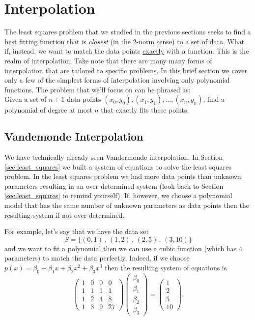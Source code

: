 \newpage
\section{Interpolation}
The least squares problem that we studied in the previous sections seeks to find a best
fitting function that is {\it closest} (in the 2-norm sense) to a set of data.  What if,
instead, we want to match the data points \underline{exactly} with a function. This is the realm of
interpolation.  Take note that there are many many forms of interpolation that are
tailored to specific problems.  In this brief section we cover only a few of the simplest
forms of interpolation involving only polynomial functions.
The problem that we'll focus on can be phrased as:\\  Given a set of $n+1$ data points $(x_0, y_0), (x_1, y_1), \ldots,
(x_n,y_n)$, find a polynomial of degree at most $n$ that exactly fits these points.
\subsection{Vandemonde Interpolation}
We have technically already seen Vandermonde interpolation.  In Section
\ref{sec:least_squares} we built a system of equations to solve the least squares problem.
In the least squares problem we had more data points than unknown parameters resulting in
an over-determined system (look back to Section \ref{sec:least_squares} to remind
yourself).  If, however, we choose a polynomial model that has the same number of unknown
parameters as data points then the resulting system if not over-determined.

For example, let's say that we have the data set 
\[ S = \{ (0,1) \, , \, (1,2) \, , \, (2,5) \, , \, (3,10) \} \]
and we want to fit a polynomial then we can use a cubic function (which has 4 parameters)
to match the data perfectly.  Indeed, if we choose $p(x) = \beta_0 + \beta_1 x + \beta_2
x^2 + \beta_3 x^3$ then the resulting system of equations is
\[ \begin{pmatrix}  1 & 0 & 0 & 0 \\
                    1 & 1 & 1 & 1 \\
                    1 & 2 & 4 & 8 \\
                    1 & 3 & 9 & 27 \end{pmatrix} \begin{pmatrix} \beta_0 \\ \beta_1 \\
                    \beta_2 \\ \beta_3 \end{pmatrix} = \begin{pmatrix} 1 \\ 2 \\ 5 \\ 10
            \end{pmatrix}. \]

